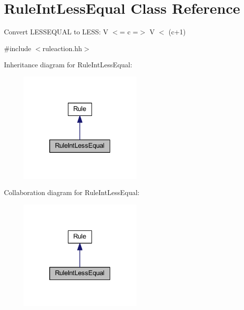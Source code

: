 \hypertarget{class_rule_int_less_equal}{}\section{Rule\+Int\+Less\+Equal Class Reference}
\label{class_rule_int_less_equal}


Convert L\+E\+S\+S\+E\+Q\+U\+AL to L\+E\+SS\+: {\ttfamily V $<$= c =$>$ V $<$ (c+1)}  




{\ttfamily \#include $<$ruleaction.\+hh$>$}



Inheritance diagram for Rule\+Int\+Less\+Equal\+:
\nopagebreak
\begin{figure}[H]
\begin{center}
\leavevmode
\includegraphics[width=172pt]{class_rule_int_less_equal__inherit__graph}
\end{center}
\end{figure}


Collaboration diagram for Rule\+Int\+Less\+Equal\+:
\nopagebreak
\begin{figure}[H]
\begin{center}
\leavevmode
\includegraphics[width=172pt]{class_rule_int_less_equal__coll__graph}
\end{center}
\end{figure}
